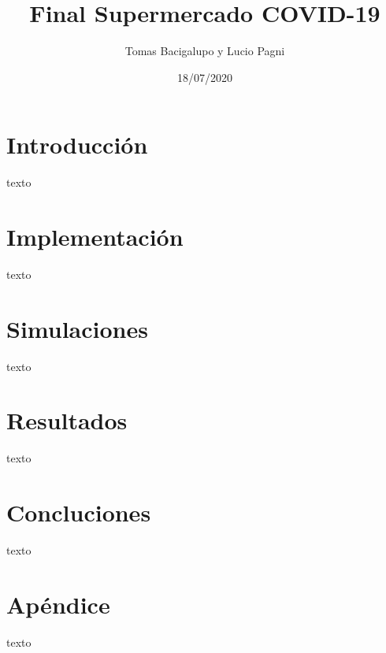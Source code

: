 \documentclass[12pt]{amsart}
\title{Final Supermercado COVID-19}
\author{Tomas Bacigalupo y Lucio Pagni}
\date{18/07/2020} %
\begin{document}
\maketitle
\tableofcontents

\section{Introducción}
texto

\section{Implementación}
texto

\section{Simulaciones}
texto

\section{Resultados}
texto

\section{Concluciones}
texto

\section{Apéndice}
texto
\end{document}
